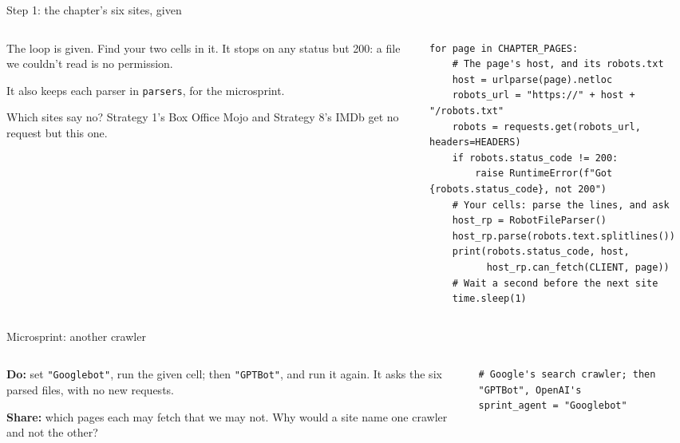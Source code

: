 \documentclass[9pt,aspectratio=169]{beamer}
\begin{document}
\begin{frame}[fragile]{Step 1: the chapter's six sites, given}
    \begin{columns}[T]
        \begin{column}{0.37\textwidth}
            The loop is given. Find your two cells in it. It stops on any status but 200: a file we couldn't read is no permission.

            \medskip
            It also keeps each parser in \texttt{parsers}, for the microsprint.

            \medskip
            Which sites say no? Strategy 1's Box Office Mojo and Strategy 8's IMDb get no request but this one.
        \end{column}
        \begin{column}{0.6\textwidth}
\begin{lstlisting}
for page in CHAPTER_PAGES:
    # The page's host, and its robots.txt
    host = urlparse(page).netloc
    robots_url = "https://" + host + "/robots.txt"
    robots = requests.get(robots_url, headers=HEADERS)
    if robots.status_code != 200:
        raise RuntimeError(f"Got {robots.status_code}, not 200")
    # Your cells: parse the lines, and ask
    host_rp = RobotFileParser()
    host_rp.parse(robots.text.splitlines())
    print(robots.status_code, host,
          host_rp.can_fetch(CLIENT, page))
    # Wait a second before the next site
    time.sleep(1)
\end{lstlisting}
        \end{column}
    \end{columns}
\end{frame}

\begin{frame}[fragile]{Microsprint: another crawler}
    \begin{columns}[T]
        \begin{column}{0.37\textwidth}
            \textbf{Do:} set \texttt{"Googlebot"}, run the given cell; then \texttt{"GPTBot"}, and run it again. It asks the six parsed files, with no new requests.

            \medskip
            \textbf{Share:} which pages each may fetch that we may not. Why would a site name one crawler and not the other?
        \end{column}
        \begin{column}{0.6\textwidth}
\begin{lstlisting}
# Google's search crawler; then "GPTBot", OpenAI's
sprint_agent = "Googlebot"
\end{lstlisting}
        \end{column}
    \end{columns}
\end{frame}
\end{document}
